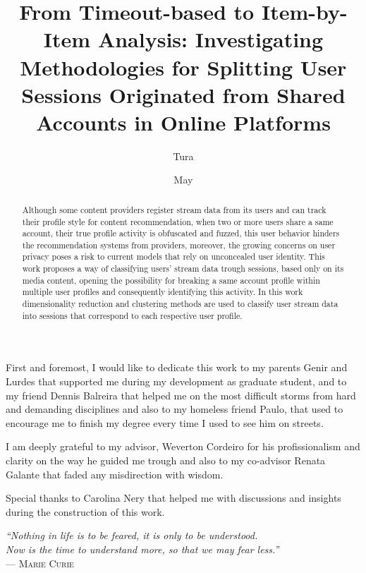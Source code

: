 \documentclass[ecp,tc,english]{iiufrgs}
\title{From Timeout-based to Item-by-Item Analysis: Investigating Methodologies for Splitting User Sessions Originated from Shared Accounts in Online Platforms}
\author{Tura}{Matheus Toazza}
\date{May}{2021}
\begin{document}
\maketitle

\begin{acknowledgements}
First and foremost, I would like to dedicate this work to my parents Genir and Lurdes that supported me during my development as graduate student, and to my friend Dennis Balreira that helped me on the most difficult storms from hard and demanding disciplines and also to my homeless friend Paulo, that used to encourage me to finish my degree every time I used to see him on streets.

I am deeply grateful to my advisor, Weverton Cordeiro for his profissionalism and clarity on the way he guided me trough and also to my co-advisor Renata Galante that faded any misdirection with wisdom.

Special thanks to Carolina Nery that helped me with discussions and insights during the construction of this work.
\end{acknowledgements}

\clearpage
\begin{flushright}
    \mbox{}
    \vfill
    {\sffamily\itshape
      ``Nothing in life is to be feared, it is only to be understood.\\
      Now is the time to understand more, so that we may fear less.''\\}
    --- \textsc{Marie Curie}
\end{flushright}

\begin{abstract}
  Although some content providers register stream data from its users and can track their profile style for content recommendation, when two or more users share a same account, their true profile activity is obfuscated and fuzzed, this user behavior hinders the recommendation systems from providers, moreover, the growing concerns on user privacy poses a risk to current models that rely on unconcealed user identity. This work proposes a way of classifying users' stream data trough sessions, based only on its media content, opening the possibility for breaking a same account profile within multiple user profiles and consequently identifying this activity. In this work dimensionality reduction and clustering methods are used to classify user stream data into sessions that correspond to each respective user profile.
\end{abstract}
\end{document}
